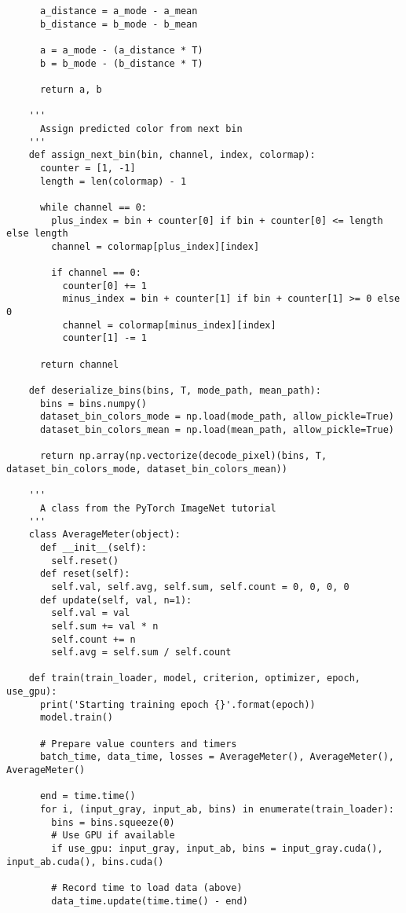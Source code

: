 \begin{longlisting}
\begin{verbatim}
      a_distance = a_mode - a_mean
      b_distance = b_mode - b_mean

      a = a_mode - (a_distance * T)
      b = b_mode - (b_distance * T)

      return a, b

    '''
      Assign predicted color from next bin
    '''
    def assign_next_bin(bin, channel, index, colormap):
      counter = [1, -1]
      length = len(colormap) - 1

      while channel == 0:
        plus_index = bin + counter[0] if bin + counter[0] <= length else length
        channel = colormap[plus_index][index]

        if channel == 0:
          counter[0] += 1
          minus_index = bin + counter[1] if bin + counter[1] >= 0 else 0
          channel = colormap[minus_index][index]
          counter[1] -= 1

      return channel

    def deserialize_bins(bins, T, mode_path, mean_path):
      bins = bins.numpy()
      dataset_bin_colors_mode = np.load(mode_path, allow_pickle=True)
      dataset_bin_colors_mean = np.load(mean_path, allow_pickle=True)

      return np.array(np.vectorize(decode_pixel)(bins, T, dataset_bin_colors_mode, dataset_bin_colors_mean))

    '''
      A class from the PyTorch ImageNet tutorial
    ''' 
    class AverageMeter(object):
      def __init__(self):
        self.reset()
      def reset(self):
        self.val, self.avg, self.sum, self.count = 0, 0, 0, 0
      def update(self, val, n=1):
        self.val = val
        self.sum += val * n
        self.count += n
        self.avg = self.sum / self.count

    def train(train_loader, model, criterion, optimizer, epoch, use_gpu):
      print('Starting training epoch {}'.format(epoch))
      model.train()

      # Prepare value counters and timers
      batch_time, data_time, losses = AverageMeter(), AverageMeter(), AverageMeter()

      end = time.time()
      for i, (input_gray, input_ab, bins) in enumerate(train_loader):
        bins = bins.squeeze(0)
        # Use GPU if available
        if use_gpu: input_gray, input_ab, bins = input_gray.cuda(), input_ab.cuda(), bins.cuda()

        # Record time to load data (above)
        data_time.update(time.time() - end)


\end{verbatim}
\end{longlisting}
